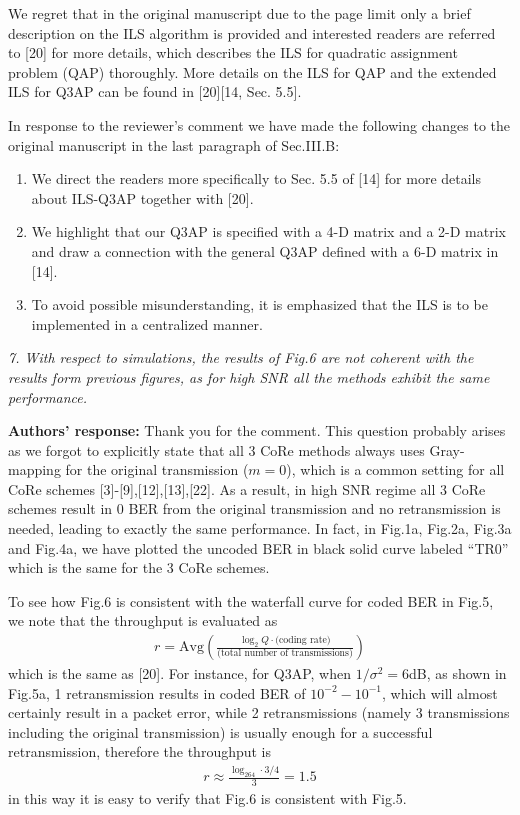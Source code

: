 \documentclass[onecolumn, 11pt, draftclsnofoot]{IEEEtran}
\begin{document}
We regret that in the original manuscript due to the page limit only a brief
description on the ILS algorithm is provided and interested readers are referred
to [20] for more details, which describes the ILS for quadratic assignment problem (QAP)
thoroughly. More details on the ILS for QAP and the extended ILS for Q3AP can be
found in [20][14, Sec. 5.5].

In response to the reviewer's comment we have made the following changes to the
original manuscript in the last paragraph of Sec.III.B:
\begin{enumerate}
  \item We direct the readers more specifically to Sec. 5.5 of [14] for more
  details about ILS-Q3AP together with [20].
  \item We highlight that our Q3AP is specified with a 4-D matrix and a
  2-D matrix and draw a connection with the general Q3AP defined with a 6-D
  matrix in [14].
  \item To avoid possible misunderstanding, it is emphasized that the ILS is to
  be implemented in a centralized manner.
\end{enumerate}

\vspace{0.5cm}

\noindent
\emph{7. With respect to simulations, the results of Fig.6 are not coherent with
the results form previous figures, as for high SNR all the methods exhibit the
same performance.}

\noindent \textbf{Authors' response:}
Thank you for the comment. This question probably arises as we forgot to
explicitly state that all 3 CoRe methods always uses Gray-mapping for the
original transmission ($m=0$), which is a common setting for all CoRe schemes
[3]-[9],[12],[13],[22]. As a result, in high SNR regime all 3 CoRe schemes
result in 0 BER from the original transmission and no retransmission is needed,
leading to exactly the same performance. In fact, in Fig.1a, Fig.2a, Fig.3a and
Fig.4a, we have plotted the uncoded BER in black solid curve labeled ``TR0''
which is the same for the 3 CoRe schemes.

To see how Fig.6 is consistent with the waterfall curve for coded BER in Fig.5,
we note that the throughput is evaluated as
\begin{align}
  r=\mbox{Avg}\left( \frac{\log_2Q \cdot\mbox{(coding rate)}}{\mbox{(total number
  of transmissions)}} \right)
\end{align}
which is the same as [20]. For instance, for Q3AP, when
$1/\sigma^2=6$dB, as shown in Fig.5a, 1 retransmission results in coded BER of
$10^{-2}-10^{-1}$, which will almost certainly result in a packet error, while 2
retransmissions (namely 3 transmissions including the original transmission) is
usually enough for a successful retransmission, therefore the throughput is
\begin{align}
  r\approx \frac{\log_264\cdot 3/4}{3} = 1.5
\end{align}
in this way it is easy to verify that Fig.6 is consistent with Fig.5.
\end{document}
